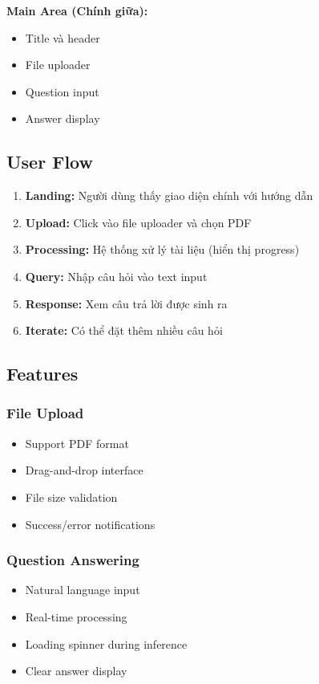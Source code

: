 \documentclass[a4paper]{article}
\begin{document}
\textbf{Main Area (Chính giữa):}
\begin{itemize}
    \item Title và header
    \item File uploader
    \item Question input
    \item Answer display
\end{itemize}
\subsection{User Flow} %
\begin{enumerate}
    \item \textbf{Landing:} Người dùng thấy giao diện chính với hướng dẫn
    \item \textbf{Upload:} Click vào file uploader và chọn PDF
    \item \textbf{Processing:} Hệ thống xử lý tài liệu (hiển thị progress)
    \item \textbf{Query:} Nhập câu hỏi vào text input
    \item \textbf{Response:} Xem câu trả lời được sinh ra
    \item \textbf{Iterate:} Có thể đặt thêm nhiều câu hỏi
\end{enumerate}
\subsection{Features} %
\subsubsection{File Upload}
\begin{itemize}
    \item Support PDF format
    \item Drag-and-drop interface
    \item File size validation
    \item Success/error notifications
\end{itemize}
\subsubsection{Question Answering}
\begin{itemize}
    \item Natural language input
    \item Real-time processing
    \item Loading spinner during inference
    \item Clear answer display
\end{itemize}
\end{document}
